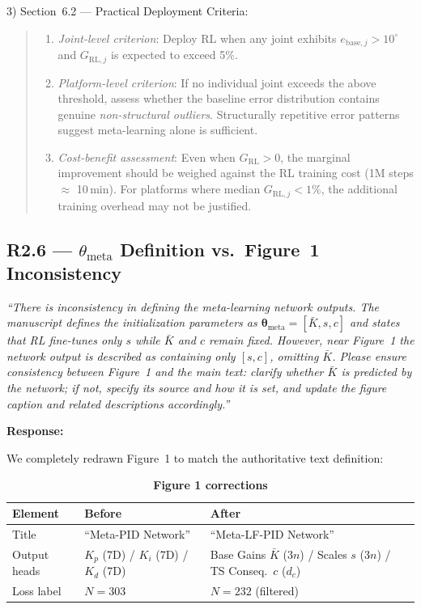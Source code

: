 \documentclass[11pt,a4paper]{article}
\newcommand{\reviewercomment}[1]{\medskip\noindent\textit{``#1''}\medskip}
\newcommand{\response}{\noindent\textbf{Response:}\par\noindent}
\begin{document}
3) Section~6.2 --- Practical Deployment Criteria:
\begin{quote}\color{blue}\small
\begin{enumerate}
    \item \textit{Joint-level criterion}: Deploy RL when any joint exhibits $e_{\mathrm{base},j} > 10^\circ$ and $G_{\mathrm{RL},j}$ is expected to exceed 5\%.
    \item \textit{Platform-level criterion}: If no individual joint exceeds the above threshold, assess whether the baseline error distribution contains genuine \textit{non-structural outliers}. Structurally repetitive error patterns suggest meta-learning alone is sufficient.
    \item \textit{Cost-benefit assessment}: Even when $G_{\mathrm{RL}} > 0$, the marginal improvement should be weighed against the RL training cost (1M steps $\approx$ 10\,min). For platforms where median $G_{\mathrm{RL},j} < 1\%$, the additional training overhead may not be justified.
\end{enumerate}
\end{quote}

\subsection*{R2.6 --- $\theta_{\mathrm{meta}}$ Definition vs.\ Figure~1 Inconsistency}

\reviewercomment{There is inconsistency in defining the meta-learning network outputs. The manuscript defines the initialization parameters as $\bm{\theta}_{\mathrm{meta}}=[\bar{K}, s, c]$ and states that RL fine-tunes only $s$ while $\bar{K}$ and $c$ remain fixed. However, near Figure~1 the network output is described as containing only $[s, c]$, omitting $\bar{K}$. Please ensure consistency between Figure~1 and the main text: clarify whether $\bar{K}$ is predicted by the network; if not, specify its source and how it is set, and update the figure caption and related descriptions accordingly.}

\response
We completely redrawn Figure~1 to match the authoritative text definition:

\begin{table}[h]
\centering\small
\caption*{\textbf{Figure 1 corrections}}
\begin{tabular}{p{}p{}p{}}
\toprule
Element & Before & After \\
\midrule
Title & ``Meta-PID Network'' & ``Meta-LF-PID Network'' \\
Output heads & $K_p$ (7D) / $K_i$ (7D) / $K_d$ (7D) & Base Gains $\bar{K}$ ($3n$) / Scales $s$ ($3n$) / TS Conseq.\ $c$ ($d_c$) \\
Loss label & $N=303$ & $N=232$ (filtered) \\
\bottomrule
\end{tabular}
\end{table}
\end{document}
